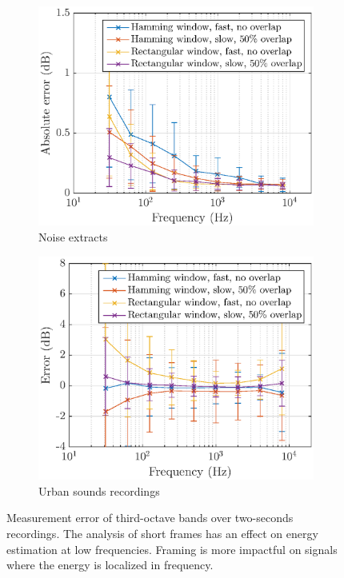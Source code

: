 \documentclass[12pt,times,onecolumn]{article}
\begin{document}
\begin{figure}[h!]
    \centering
    \begin{subfigure}[h]{0.45\textwidth}
        \centering
        \includegraphics[width=\linewidth]{figures/err_m_n.eps} 
        \caption{Noise extracts}
    \end{subfigure}
    \hfill
    \begin{subfigure}[h]{0.45\textwidth}
        \centering
        \includegraphics[width=\linewidth]{figures/err_m_u.eps} 
        \caption{Urban sounds recordings}
    \end{subfigure}
    \caption{\label{fig:error_m}Measurement error of third-octave bands over two-seconds recordings. The analysis of short frames has an effect on energy estimation at low frequencies. Framing is more impactful on signals where the energy is localized in frequency.}
\end{figure}
\end{document}
